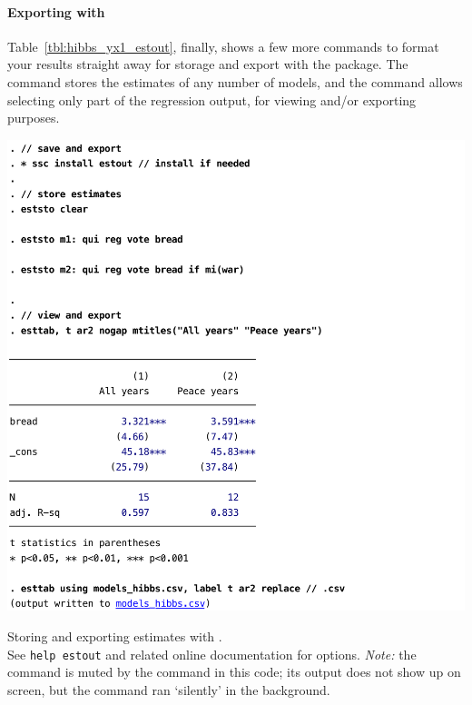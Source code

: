 
\paragraph{Exporting with }%

Table~\ref{tbl:hibbs_yx1_estout}, finally, shows a few more commands to format your results straight away for storage and export with the  package. The  command stores the estimates of any number of models, and the  command allows selecting only part of the regression output, for viewing and/or exporting purposes.

\begin{table}[htp]
	\includegraphics[scale=.5]{images/hibbs_yx1_estout.pdf}

	\caption[Storing estimates with ]{\label{tbl:hibbs_yx1_estout}
	Storing and exporting estimates with .\\
	See \texttt{help estout} and related online documentation for options. \emph{Note:} the  command is muted by the  command in this code; its output does not show up on screen, but the command ran `silently' in the background. }
\end{table}%

